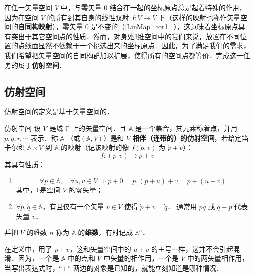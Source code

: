 

在任一矢量空间 $V$ 中，与零矢量 $0$ 结合在一起的坐标原点总是起着特殊的作用，因为在空间 $V$ 的所有到其自身的线性双射 $f:V\rightarrow V$ 下（这样的映射也称作矢量空间的\textbf{自同构映射}），零矢量 $0$ 是不变的（\autoref{LinMap_cor1}~），这意味着坐标原点具有突出于其它空间点的性质．然而，对身处3维空间中的我们来说，放置在不同位置的点线面显然不依赖于一个挑选出来的坐标原点．因此，为了满足我们的需求，我们希望把矢量空间的自同构群加以扩展，使得所有的空间点都等价．完成这一任务的属于\textbf{仿射空间}．
\subsection{仿射空间}\label{AfSp_sub1}
仿射空间的定义是基于矢量空间的．
\begin{definition}{仿射空间}\label{AfSp_def1}
设 $V$ 是域 $\mathbb F$ 上的矢量空间．且 $\mathbb A$ 是一个集合，其元素称着\textbf{点}，并用 $\dot{p},\dot{q},\dot{r},\cdots$ 表示．称 $\mathbb A$ （或$(\mathbb A,V)$）是和 $V$ \textbf{相伴（连带的）的仿射空间}，若给定笛卡尔积 $\mathbb A\times V$ 到 $\mathbb A$ 的映射（记该映射的像 $f(\dot p,v)$ 为 $\dot p+v$）：
\begin{equation}
f:(\dot p,v)\mapsto\dot p+v
\end{equation}
其具有性质：
\begin{enumerate}
\item \begin{equation}
\forall \dot p\in\mathbb A,\quad \forall u,v\in V\Rightarrow\dot p+0=\dot p,(\dot p+u)+v=\dot p+(u+v)
\end{equation}
其中，0是空间 $V$ 的零矢量；
\item $\forall \dot p,\dot q\in\mathbb A$，有且仅有一个矢量 $v\in V$ 使得 $\dot p+v=\dot q$． 通常用 $\vec{pq}$ 或 $\dot q-\dot p$ 代表矢量 $v$．
\end{enumerate}
并把 $V$ 的维数 $n$ 称为 $\mathbb A$ 的\textbf{维数}，有时记成 $\mathbb A^n$．
\end{definition}
在定义中，用了 $\dot p+v$，这和矢量空间中的 $u+v$ 的＋号一样，这并不会引起混淆．因为，一个是 $\mathbb A$ 中的点和 $V$ 中矢量的相作用，一个是 $V$ 中的两矢量相作用，当写出表达式时，“+” 两边的对象是已知的，就能立刻知道是哪种情况．

